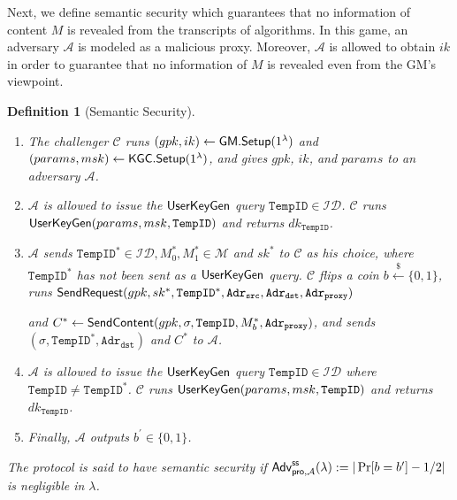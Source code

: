 \documentclass[preprint]{sig-alternate}
\newtheorem{definition}{Definition}[section]
\begin{document}
\noindent 
Next, we define semantic security which guarantees that no information of content $M$ is revealed from the transcripts of algorithms. In this game, an adversary $\mathcal{A}$ is modeled as a malicious proxy. Moreover, $\mathcal{A}$ is allowed to obtain $ik$ in order to guarantee that no information of $M$ is revealed even from the GM's viewpoint. 

\begin{definition}[Semantic Security]~
\begin{enumerate}
\setlength{\itemsep}{0em}\setlength{\parsep}{0em}
\item The challenger $\mathcal{C}$ runs $(gpk,ik)\leftarrow{\sf GM.Setup}(1^\lambda)$ and $(params,msk)\leftarrow {\sf KGC.Setup}(1^\lambda)$, and gives $gpk$, $ik$, and $params$ to an adversary $\mathcal{A}$. 

\item $\mathcal{A}$ is allowed to issue the ${\sf UserKeyGen}$ query $\mathtt{TempID}\in\mathcal{ID}$. $\mathcal{C}$ runs ${\sf UserKeyGen}(params,msk,\allowbreak \mathtt{TempID})$ and returns $dk_{\mathtt{TempID}}$. 

\item $\mathcal{A}$ sends $\mathtt{TempID}^\ast\in\mathcal{ID}, M_0^\ast,M_1^\ast\in\mathcal{M}$ and $sk^\ast$ to $\mathcal{C}$ as his choice, where $\mathtt{TempID}^\ast$ has not been sent as a ${\sf UserKeyGen}$ query. $\mathcal{C}$ flips a coin $b\stackrel{\$}{\leftarrow}\{0,1\}$, runs ${\sf SendRequest}(gpk,\allowbreak sk^\ast,\mathtt{TempID}^\ast,\allowbreak \mathtt{Adr_{src}},\mathtt{Adr_{dst}},\mathtt{Adr_{proxy}})$

\noindent and $C^\ast\leftarrow {\sf SendContent}(gpk,\sigma,\allowbreak \mathtt{TempID},\allowbreak M^\ast_b,\mathtt{Adr_{proxy}})$, and sends $(\sigma,\mathtt{TempID}^\ast,\mathtt{Adr_{dst}})$ and $C^\ast$ to $\mathcal{A}$. 

\item $\mathcal{A}$ is allowed to issue the ${\sf UserKeyGen}$ query $\mathtt{TempID}\in\mathcal{ID}$ where $\mathtt{TempID}\neq \mathtt{TempID}^\ast$. $\mathcal{C}$ runs ${\sf UserKeyGen}(params,\allowbreak msk,\allowbreak \mathtt{TempID})$ and returns $dk_{\mathtt{TempID}}$. 

\item Finally, $\mathcal{A}$ outputs $b^\prime\in\{0,1\}$. 
\end{enumerate}

\noindent 
The protocol is said to have semantic security if ${\sf Adv}^{{\sf ss}}_{{\sf pro},\mathcal{A}}(\lambda):=|\Pr[b=b^\prime]-1/2|$ is negligible in $\lambda$. 
\end{definition}
\end{document}
